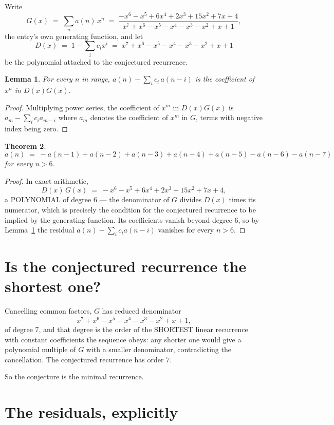 \documentclass[11pt,a4paper]{article}
\theoremstyle{plain}
\newtheorem{theorem}{Theorem}
\newtheorem{lemma}[theorem]{Lemma}
\theoremstyle{definition}
\begin{document}
Write
\[
G(x)\;=\;\sum_{n}a(n)\,x^{n}\;=\;\frac{- x^{6} - x^{5} + 6 x^{4} + 2 x^{3} + 15 x^{2} + 7 x + 4}{x^{7} + x^{6} - x^{5} - x^{4} - x^{3} - x^{2} + x + 1},
\]
the entry's own generating function, and let
\[
D(x)\;=\;1-\sum_i c_i x^{i}\;=\;x^{7} + x^{6} - x^{5} - x^{4} - x^{3} - x^{2} + x + 1
\]
be the polynomial attached to the conjectured recurrence.

\begin{lemma}\label{lem:key}
For every $n$ in range, $a(n)-\sum_i c_i\,a(n-i)$ is the coefficient of $x^{n}$ in
$D(x)G(x)$.
\end{lemma}

\begin{proof}
Multiplying power series, the coefficient of $x^{m}$ in $D(x)G(x)$ is
$a_m-\sum_i c_i a_{m-i}$ where $a_m$ denotes the coefficient of $x^{m}$ in $G$, terms with
negative index being zero.
\end{proof}

\begin{theorem}
\[
a(n)\;=\;-a(n-1) + a(n-2) + a(n-3) + a(n-4) + a(n-5) - a(n-6) - a(n-7)
\]
for every $n>6$.
\end{theorem}

\begin{proof}
In exact arithmetic,
\[
D(x)\,G(x)\;=\;- x^{6} - x^{5} + 6 x^{4} + 2 x^{3} + 15 x^{2} + 7 x + 4,
\]
a POLYNOMIAL of degree $6$ --- the denominator of $G$ divides $D(x)$ times its numerator,
which is precisely the condition for the conjectured recurrence to be implied by the
generating function. Its coefficients vanish beyond degree $6$, so by
Lemma~\ref{lem:key} the residual $a(n)-\sum_ic_ia(n-i)$ vanishes for every
$n>6$.
\end{proof}

\section{Is the conjectured recurrence the shortest one?}

Cancelling common factors, $G$ has reduced denominator
\[
x^{7} + x^{6} - x^{5} - x^{4} - x^{3} - x^{2} + x + 1,
\]
of degree $7$, and that degree is the order of the SHORTEST linear recurrence with
constant coefficients the sequence obeys: any shorter one would give a polynomial multiple of
$G$ with a smaller denominator, contradicting the cancellation. The conjectured recurrence has
order $7$.

So the conjecture is the minimal recurrence.

\section{The residuals, explicitly}
\end{document}
